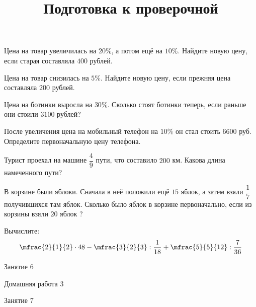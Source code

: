 \begin{class}[number=5]
	\begin{listofex}
		\item  Цена на товар увеличилась на \( 20\% \), а потом ещё на \( 10\% \). Найдите новую цену, если старая составляла \( 400 \) рублей.
		\item  Цена на товар снизилась на \( 5\% \). Найдите новую цену, если прежняя цена составляла \( 200 \) рублей.
		\item Цена на ботинки выросла на \( 30\% \). Сколько стоят ботинки теперь, если раньше они стоили \( 3100 \) рублей?
		\item После увеличения цена на мобильный телефон на \( 10\% \) он стал стоить \( 6600 \) руб. Определите первоначальную цену телефона.
		\item Турист проехал на машине \( \dfrac{4}{9} \) пути, что составило \( 200 \) км. Какова длина намеченного пути?
		\item В корзине были яблоки. Сначала в неё положили ещё \( 15 \) яблок, а затем взяли \( \dfrac{1}{7} \) получившихся там яблок. Сколько было яблок в корзине первоначально, если из корзины взяли \( 20 \) яблок ?
		\item Вычислите:
		\[\mfrac{2}{1}{2}\cdot48-\mfrac{3}{2}{3}:\dfrac{1}{18}+\mfrac{5}{5}{12}:\dfrac{7}{36}\]
	\end{listofex}
\end{class}

\begin{class}[number=6]
	\begin{listofex}
		\item Занятие 6
	\end{listofex}
\end{class}

\begin{homework}[number=3]
	\begin{listofex}
		\item Домашняя работа 3
	\end{listofex}
\end{homework}

\begin{class}[number=7]
	\title{Подготовка к проверочной}
	\begin{listofex}
		\item Занятие 7
	\end{listofex}
\end{class}

